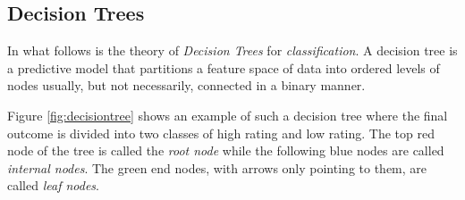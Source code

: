 



\subsection{Decision Trees}\label{sec:Decision Trees}
In what follows is the theory of \textit{Decision Trees} for \textit{classification}.
A decision tree is a predictive model that partitions a feature space of data into ordered levels of nodes usually, but not necessarily, connected in a binary manner.

Figure \ref{fig:decisiontree} shows an example of such a decision tree where the final outcome is divided into two classes of high rating and low rating. The top red node of the tree is called the \textit{root node} while the following blue nodes are called \textit{internal nodes}. The green end nodes, with arrows only pointing to them, are called \textit{leaf nodes}.

